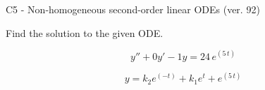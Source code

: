 \begin{exercise}
  \begin{exerciseTitle}C5 - Non-homogeneous second-order linear ODEs (ver. 92)\end{exerciseTitle}
  \begin{exerciseStatement}
    
Find the solution to the given ODE.

    
\[y''+0y'-1y = 24 \, e^{\left(5 \, t\right)}\]

  \end{exerciseStatement}
  \begin{exerciseAnswer}
    
\[y= k_{2} e^{\left(-t\right)} + k_{1} e^{t} + e^{\left(5 \, t\right)}\]

  \end{exerciseAnswer}
\end{exercise}